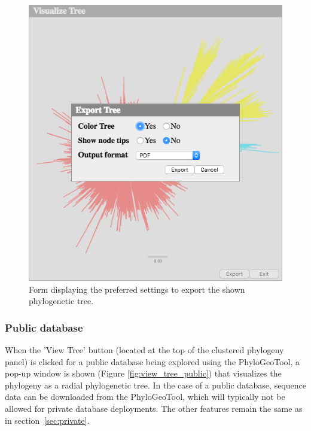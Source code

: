 \documentclass[a4paper, 11pt]{article} %
\begin{document}
\begin{figure}[H]
\centering
\includegraphics[scale=0.50]{images/export_tree.PNG}
\vspace{-0.25cm}
\caption{Form displaying the preferred settings to export the shown phylogenetic tree.}
\label{fig:export_tree}
\end{figure}


\subsubsection{Public database}

When the 'View Tree' button (located at the top of the clustered phylogeny panel) is clicked for a public database being explored using the PhyloGeoTool, a pop-up window is shown (Figure \ref{fig:view_tree_public}) that visualizes the phylogeny as a radial phylogenetic tree.
In the case of a public database, sequence data can be downloaded from the PhyloGeoTool, which will typically not be allowed for private database deployments.
The other features remain the same as in section~\ref{sec:private}.
\end{document}
